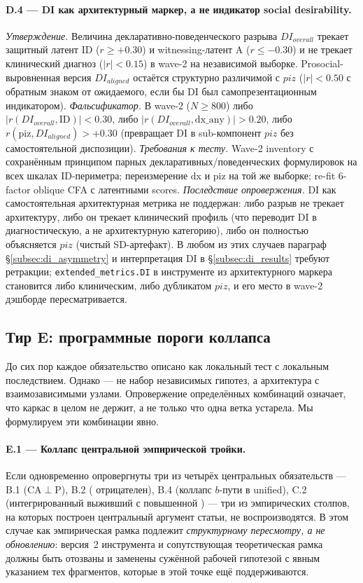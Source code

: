 \paragraph{D.4 --- DI как архитектурный маркер, а не индикатор social desirability.}
\emph{Утверждение.} Величина декларативно-поведенческого разрыва $DI_{overall}$ трекает защитный латент ID ($r \geq +0.30$) и witnessing-латент A ($r \leq -0.30$) и не трекает клинический диагноз ($|r| < 0.15$) в wave-2 на независимой выборке. Prosocial-выровненная версия $DI_{aligned}$ остаётся структурно различимой с $piz$ ($|r| < 0.50$ с обратным знаком от ожидаемого, если бы DI был самопрезентационным индикатором).
\emph{Фальсификатор.} В wave-2 ($N \geq 800$) либо $|r(DI_{overall}, \text{ID})| < 0.30$, либо $|r(DI_{overall}, \text{dx\_any})| > 0.20$, либо $r(\text{piz}, DI_{aligned}) > +0.30$ (превращает DI в sub-компонент $piz$ без самостоятельной диспозиции).
\emph{Требования к тесту.} Wave-2 inventory с сохранённым принципом парных декларативных/поведенческих формулировок на всех шкалах ID-периметра; переизмерение dx и piz на той же выборке; re-fit 6-factor oblique CFA с латентными scores.
\emph{Последствие опровержения.} DI как самостоятельная архитектурная метрика не поддержан: либо разрыв не трекает архитектуру, либо он трекает клинический профиль (что переводит DI в диагностическую, а не архитектурную категорию), либо он полностью объясняется $piz$ (чистый SD-артефакт). В любом из этих случаев параграф §\ref{subsec:di_asymmetry} и интерпретация DI в §\ref{subsec:di_results} требуют ретракции; \texttt{extended\_metrics.DI} в инструменте из архитектурного маркера становится либо клиническим, либо дубликатом $piz$, и его место в wave-2 дэшборде пересматривается.

\subsection{Тир E: программные пороги коллапса}
\label{subsec:collapse_thresholds}

До сих пор каждое обязательство описано как локальный тест с локальным последствием. Однако \DEIC{} --- не набор независимых гипотез, а архитектура с взаимозависимыми узлами. Опровержение определённых комбинаций означает, что каркас в целом не держит, а не только что одна ветка устарела. Мы формулируем эти комбинации явно.

\paragraph{E.1 --- Коллапс центральной эмпирической тройки.}
Если одновременно опровергнуты три из четырёх центральных обязательств --- B.1 (CA$\perp$P), B.2 (\IMM{} отрицателен), B.4 (коллапс $b$-пути в unified), C.2 (интегрированный выживший с повышенной \EAF{}) --- три из эмпирических столпов, на которых построен центральный аргумент статьи, не воспроизводятся. В этом случае \DEIC{} как эмпирическая рамка подлежит \emph{структурному пересмотру, а не обновлению}: версия~2 инструмента и сопутствующая теоретическая рамка должны быть отозваны и заменены сужённой рабочей гипотезой с явным указанием тех фрагментов, которые в этой точке ещё поддерживаются.

